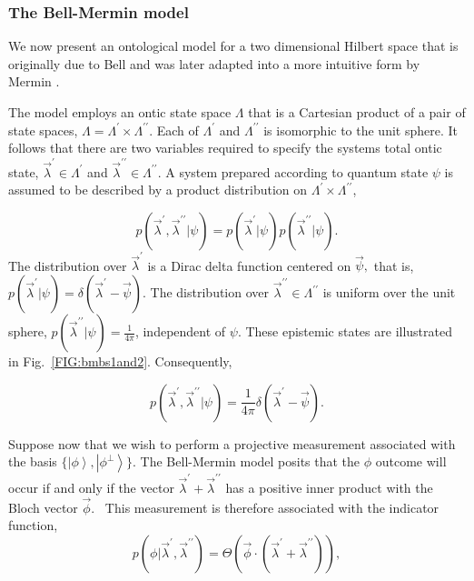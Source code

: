 \documentclass[aps,nofootinbib,12pt]{revtex4-2}
\begin{document}
\subsubsection{The Bell-Mermin model \label{SEC:example_bellmermin}}

We now present an ontological model for a two dimensional Hilbert
space that is originally due to Bell \cite{Bell_probhv} and was
later adapted into a more intuitive form by Mermin
\cite{Mermin_bell}. \

The model employs an ontic state space $\Lambda$ that is a Cartesian
product of a pair of state spaces,
$\Lambda=\Lambda^{\prime}\times\Lambda ^{\prime\prime}$. Each of
$\Lambda^{\prime}$ and $\Lambda^{\prime\prime}$ is isomorphic to the
unit sphere. It follows that there are two variables required to
specify the systems total ontic state,
$\vec{\lambda}^{\prime}\in\Lambda^{\prime}$ and
$\vec{\lambda}^{\prime\prime}\in\Lambda^{\prime\prime}$. A system
prepared according to quantum state $\psi$ is assumed to be
described by a product
distribution on $\Lambda^{\prime}\times\Lambda^{\prime\prime}$,%

\begin{equation}
p(\vec{\lambda}^{\prime},\vec{\lambda}^{\prime\prime}|\psi)=p(\vec{\lambda
}^{\prime}|\psi)p(\vec{\lambda}^{\prime\prime}|\psi).
\end{equation}
The distribution over $\vec{\lambda}^{\prime}$ is a Dirac delta
function centered on $\vec{\psi},$ that is,
$p(\vec{\lambda}^{\prime}|\psi)=\delta(\vec{\lambda}^{\prime}-\vec{\psi})$.
The distribution over
$\vec{\lambda}^{\prime\prime}\in\Lambda^{\prime\prime}$ is uniform
over the unit sphere,
$p(\vec{\lambda}^{\prime\prime}|\psi)=\frac{1}{4\pi}$, independent
of $\psi $. These epistemic states are illustrated in
Fig.~\ref{FIG:bmbs1and2}. Consequently,

\begin{equation}
p(\vec{\lambda}^{\prime},\vec{\lambda}^{\prime\prime}|\psi)=\frac{1}{4\pi
}\delta(\vec{\lambda}^{\prime}-\vec{\psi}).
\end{equation}


Suppose now that we wish to perform a projective measurement
associated with the basis $\{\left\vert \phi\right\rangle
,\left\vert \phi^{\perp }\right\rangle \}$. The Bell-Mermin model
posits that the $\phi$ outcome will occur if and only if the vector
$\vec{\lambda}^{\prime}+\vec{\lambda }^{\prime\prime}$ has a
positive inner product with the Bloch vector $\vec{\phi}.$ \ This
measurement is therefore associated with the indicator function,
\begin{equation}
p(\phi|\vec{\lambda}^{\prime},\vec{\lambda}^{\prime\prime})=\Theta(\vec{\phi
}\cdot(\vec{\lambda}^{\prime}+\vec{\lambda}^{\prime\prime})),
\label{BMif}
\end{equation}
\end{document}
